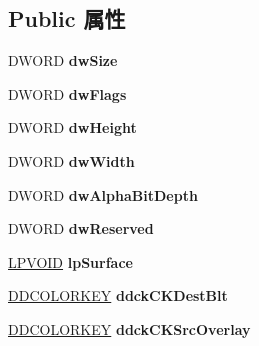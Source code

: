 \subsection*{Public 属性}
\begin{DoxyCompactItemize}
\item 
\mbox{\label{struct___d_d_s_u_r_f_a_c_e_d_e_s_c2_ae92d5a90aaf023fbc33cb18a0af1543d}} 
D\+W\+O\+RD {\bfseries dw\+Size}
\item 
\mbox{\label{struct___d_d_s_u_r_f_a_c_e_d_e_s_c2_ab1693d0a625528c1a45fa24d57affd67}} 
D\+W\+O\+RD {\bfseries dw\+Flags}
\item 
\mbox{\label{struct___d_d_s_u_r_f_a_c_e_d_e_s_c2_a0e4a6e20f40980afcee0eeb72bb5319a}} 
D\+W\+O\+RD {\bfseries dw\+Height}
\item 
\mbox{\label{struct___d_d_s_u_r_f_a_c_e_d_e_s_c2_a0c70654874578fba3cffa0aa70a20b36}} 
D\+W\+O\+RD {\bfseries dw\+Width}
\item 
\mbox{\label{struct___d_d_s_u_r_f_a_c_e_d_e_s_c2_a6a82e01d129b5b91a8a566a7420a0d55}} 
D\+W\+O\+RD {\bfseries dw\+Alpha\+Bit\+Depth}
\item 
\mbox{\label{struct___d_d_s_u_r_f_a_c_e_d_e_s_c2_ab6c9606176b01543221b7048abcd3004}} 
D\+W\+O\+RD {\bfseries dw\+Reserved}
\item 
\mbox{\label{struct___d_d_s_u_r_f_a_c_e_d_e_s_c2_acdcc5e70a991a42221128e415e49c8e5}} 
\hyperlink{interfacevoid}{L\+P\+V\+O\+ID} {\bfseries lp\+Surface}
\item 
\mbox{\label{struct___d_d_s_u_r_f_a_c_e_d_e_s_c2_aabdf1f4a1a1fab27cd3aff0ff6282362}} 
\hyperlink{struct_d_d_c_o_l_o_r_k_e_y}{D\+D\+C\+O\+L\+O\+R\+K\+EY} {\bfseries ddck\+C\+K\+Dest\+Blt}
\item 
\mbox{\label{struct___d_d_s_u_r_f_a_c_e_d_e_s_c2_a790bac2f11f17d6fe7f121065f9d07f2}} 
\hyperlink{struct_d_d_c_o_l_o_r_k_e_y}{D\+D\+C\+O\+L\+O\+R\+K\+EY} {\bfseries ddck\+C\+K\+Src\+Overlay}

\end{DoxyCompactItemize}
